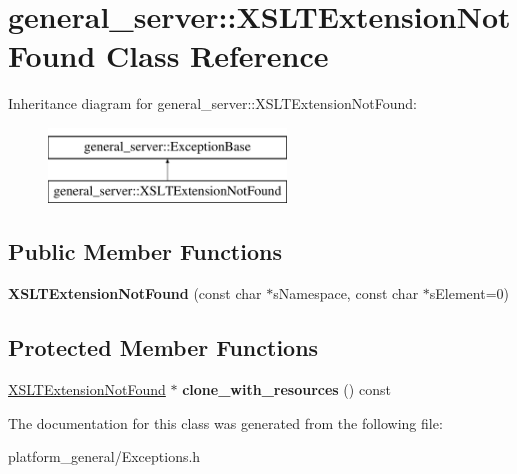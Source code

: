 \hypertarget{classgeneral__server_1_1XSLTExtensionNotFound}{\section{general\-\_\-server\-:\-:\-X\-S\-L\-T\-Extension\-Not\-Found \-Class \-Reference}
\label{classgeneral__server_1_1XSLTExtensionNotFound}
}
\-Inheritance diagram for general\-\_\-server\-:\-:\-X\-S\-L\-T\-Extension\-Not\-Found\-:\begin{figure}[H]
\begin{center}
\leavevmode
\includegraphics[height=2.000000cm]{classgeneral__server_1_1XSLTExtensionNotFound}
\end{center}
\end{figure}
\subsection*{\-Public \-Member \-Functions}
\begin{DoxyCompactItemize}
\item 
\hypertarget{classgeneral__server_1_1XSLTExtensionNotFound_a3f516485027f19e63781c98756ddca7e}{{\bfseries \-X\-S\-L\-T\-Extension\-Not\-Found} (const char $\ast$s\-Namespace, const char $\ast$s\-Element=0)}\label{classgeneral__server_1_1XSLTExtensionNotFound_a3f516485027f19e63781c98756ddca7e}

\end{DoxyCompactItemize}
\subsection*{\-Protected \-Member \-Functions}
\begin{DoxyCompactItemize}
\item 
\hypertarget{classgeneral__server_1_1XSLTExtensionNotFound_aaeaca74753ce51aeab9766ccb93d3fcf}{\hyperlink{classgeneral__server_1_1XSLTExtensionNotFound}{\-X\-S\-L\-T\-Extension\-Not\-Found} $\ast$ {\bfseries clone\-\_\-with\-\_\-resources} () const }\label{classgeneral__server_1_1XSLTExtensionNotFound_aaeaca74753ce51aeab9766ccb93d3fcf}

\end{DoxyCompactItemize}


\-The documentation for this class was generated from the following file\-:\begin{DoxyCompactItemize}
\item 
platform\-\_\-general/\-Exceptions.\-h\end{DoxyCompactItemize}
